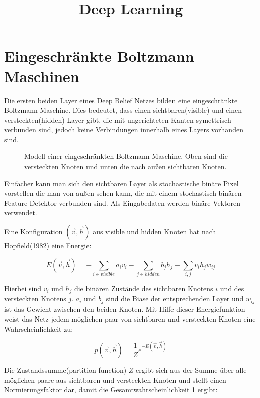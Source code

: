 \documentclass[12pt]{article}
\title{Deep Learning}
\begin{document}
	\maketitle

	\newpage

	\tableofcontents
	
	\newpage
	\section{Eingeschränkte Boltzmann Maschinen}
	
	Die ersten beiden Layer eines Deep Belief Netzes bilden eine eingeschränkte Boltzmann Maschine. Dies bedeutet, dass einen sichtbaren(visible) und einen versteckten(hidden) Layer gibt, die mit ungerichteten Kanten symettrisch verbunden sind, jedoch keine Verbindungen innerhalb eines Layers vorhanden sind.
	
	
	\begin{figure}[H]
	
	\caption{Modell einer eingeschränkten Boltzmann Maschine. Oben sind die versteckten Knoten und unten die nach außen sichtbaren Knoten.}
	\end{figure}

Einfacher kann man sich den sichtbaren Layer als stochastische binäre Pixel vorstellen die man von außen sehen kann, die mit einem stochastisch binären Feature Detektor verbunden sind. Als Eingabedaten werden binäre Vektoren verwendet.

Eine Konfiguration $(\vec{v},\vec{h})$ aus visible und hidden Knoten hat nach Hopfield(1982) eine Energie:

\begin{equation}
E(\vec{v},\vec{h})= - \sum_{i \in visible} a_iv_i- \sum_{j \in hidden} b_j h_j - \sum_{i,j} v_i h_j w_{ij}
\end{equation}

Hierbei sind $v_i$ und $h_j$ die binären Zustände des sichtbaren Knotens $i$ und des versteckten Knotens $j$. $a_i$ und $b_j$ sind die Biase der entsprechenden Layer und $w_{ij}$ ist das Gewicht zwischen den beiden Knoten. Mit Hilfe dieser Energiefunktion weist das Netz jedem möglichen paar von sichtbaren und versteckten Knoten eine Wahrscheinlichkeit zu:

\begin{equation}
p(\vec{v},\vec{h})= \frac{1}{Z} e^{-E(\vec{v},\vec{h})}
\end{equation}

Die Zustandssumme(partition function) $Z$ ergibt sich aus der Summe über alle möglichen paare aus sichtbaren und versteckten Knoten und stellt einen Normierungsfaktor dar, damit die Gesamtwahrscheinlichkeit 1 ergibt:
\end{document}
